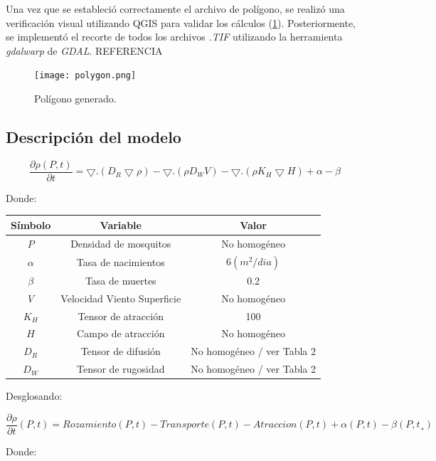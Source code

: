 Una vez que se estableció correctamente el archivo de polígono, se realizó una verificación visual utilizando QGIS para validar los cálculos (\figurename \ref{fig:polygon}). Posteriormente, se implementó el recorte de todos los archivos \textit{.TIF} utilizando la herramienta \textit{gdalwarp} de \textit{GDAL}. REFERENCIA


\begin{figure}[H]
	\texttt{[image: polygon.png]}
	\centering
	\caption{Polígono generado.}
	\label{fig:polygon}
\end{figure}

\subsection{Descripción del modelo}

$$\frac{\partial \rho(P,t)}{\partial t}=\bigtriangledown .(D_R \bigtriangledown \rho)-\bigtriangledown.(\rho D_W V)- \bigtriangledown . (\rho K_H \bigtriangledown H) + \alpha - \beta$$

Donde:

\onehalfspacing
\begin{center}
	\begin{tabular}{|c | c | c|} 
		\hline
		\textbf{Símbolo} & \textbf{Variable} & \textbf{Valor}\\
		\hline
		$$P$$ & Densidad de mosquitos & No homogéneo \\
		\hline
		$\alpha$  & Tasa de nacimientos & $6 (m^2/dia)$ \\
		\hline
		$\beta$  & Tasa de muertes             & 0.2 \\
		\hline
		$V$   & Velocidad Viento Superficie & No homogéneo \\
		\hline
		$K_H$   & Tensor de atracción         & 100 \\
		\hline
		$H$    & Campo de atracción          & No homogéneo \\
		\hline
		$D_R$   & Tensor de difusión          & No homogéneo / ver Tabla 2 \\
		\hline
		$D_W$   & Tensor de rugosidad         & No homogéneo / ver Tabla 2\\
		\hline
	\end{tabular}
\end{center}

Desglosando:

$$\frac{\partial \rho}{\partial t} (P,t)= Rozamiento(P,t)-Transporte(P,t)-Atraccion(P,t)+\alpha (P,t) - \beta (P,t¸)$$


Donde:
\doublespacing


